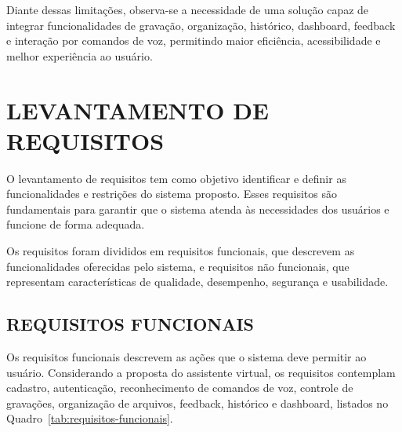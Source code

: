 \documentclass[12pt,oneside,a4paper,brazil,final]{abntex2}
\begin{document}
Diante dessas limitações, observa-se a necessidade de uma solução capaz de integrar funcionalidades de gravação, organização, histórico, dashboard, feedback e interação por comandos de voz, permitindo maior eficiência, acessibilidade e melhor experiência ao usuário.






\chapter{LEVANTAMENTO DE REQUISITOS}



O levantamento de requisitos tem como objetivo identificar e definir as funcionalidades e restrições do sistema proposto. Esses requisitos são fundamentais para garantir que o sistema atenda às necessidades dos usuários e funcione de forma adequada.



Os requisitos foram divididos em requisitos funcionais, que descrevem as funcionalidades oferecidas pelo sistema, e requisitos não funcionais, que representam características de qualidade, desempenho, segurança e usabilidade.



\section{REQUISITOS FUNCIONAIS}



Os requisitos funcionais descrevem as ações que o sistema deve permitir ao usuário. Considerando a proposta do assistente virtual, os requisitos contemplam cadastro, autenticação, reconhecimento de comandos de voz, controle de gravações, organização de arquivos, feedback, histórico e dashboard, listados no Quadro~\ref{tab:requisitos-funcionais}.
\end{document}
